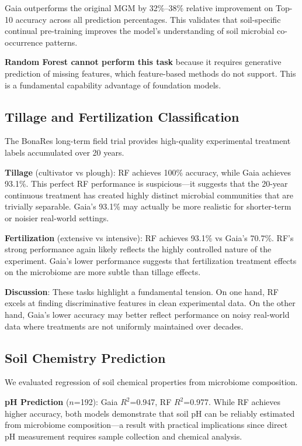 \documentclass[11pt,a4paper]{article}
\begin{document}
Gaia outperforms the original MGM by 32\%--38\% relative improvement on Top-10 accuracy across all prediction percentages. This validates that soil-specific continual pre-training improves the model's understanding of soil microbial co-occurrence patterns.

\textbf{Random Forest cannot perform this task} because it requires generative prediction of missing features, which feature-based methods do not support. This is a fundamental capability advantage of foundation models.

\subsection{Tillage and Fertilization Classification}

The BonaRes long-term field trial provides high-quality experimental treatment labels accumulated over 20 years.

\textbf{Tillage} (cultivator vs plough): RF achieves 100\% accuracy, while Gaia achieves 93.1\%. This perfect RF performance is suspicious---it suggests that the 20-year continuous treatment has created highly distinct microbial communities that are trivially separable. Gaia's 93.1\% may actually be more realistic for shorter-term or noisier real-world settings.

\textbf{Fertilization} (extensive vs intensive): RF achieves 93.1\% vs Gaia's 70.7\%. RF's strong performance again likely reflects the highly controlled nature of the experiment. Gaia's lower performance suggests that fertilization treatment effects on the microbiome are more subtle than tillage effects.

\textbf{Discussion}: These tasks highlight a fundamental tension. On one hand, RF excels at finding discriminative features in clean experimental data. On the other hand, Gaia's lower accuracy may better reflect performance on noisy real-world data where treatments are not uniformly maintained over decades.

\subsection{Soil Chemistry Prediction}

We evaluated regression of soil chemical properties from microbiome composition.

\textbf{pH Prediction} ($n$=192): Gaia $R^2$=0.947, RF $R^2$=0.977. While RF achieves higher accuracy, both models demonstrate that soil pH can be reliably estimated from microbiome composition---a result with practical implications since direct pH measurement requires sample collection and chemical analysis.
\end{document}
